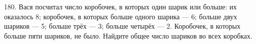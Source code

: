 180. Вася посчитал число коробочек, в которых один шарик или больше: их оказалось 8; коробочек, в которых больше одного шарика --- 6; больше двух шариков --- 5; больше трёх --- 3; больше четырёх --- 2. Коробочек, в которых больше пяти шариков, не было. Найдите общее число шариков во всех коробках.\\
